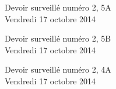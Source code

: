 \documentclass[a4paper,10pt]{article}
\begin{document}
\begin{feuilleDS}{Devoir surveillé numéro 2, 5A\\ \small Vendredi 17 octobre 2014}  %
\end{feuilleDS}

\begin{feuilleDS}{Devoir surveillé numéro 2, 5B\\ \small Vendredi 17 octobre 2014}  %
\end{feuilleDS}

\begin{feuilleDS}{Devoir surveillé numéro 2, 4A\\ \small Vendredi 17 octobre 2014}
\end{feuilleDS}



\end{document}
